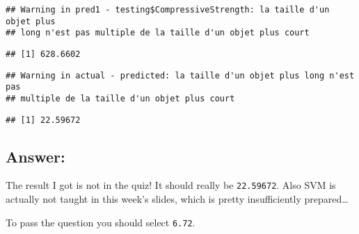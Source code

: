 \documentclass[]{article}
\newenvironment{Shaded}{\begin{snugshade}}{\end{snugshade}}
\newcommand{\KeywordTok}[1]{\textcolor[rgb]{0.13,0.29,0.53}{\textbf{#1}}}
\newcommand{\OperatorTok}[1]{\textcolor[rgb]{0.81,0.36,0.00}{\textbf{#1}}}
\newcommand{\NormalTok}[1]{#1}
\begin{document}
\begin{verbatim}
## Warning in pred1 - testing$CompressiveStrength: la taille d'un objet plus
## long n'est pas multiple de la taille d'un objet plus court
\end{verbatim}

\begin{verbatim}
## [1] 628.6602
\end{verbatim}

\begin{Shaded}
\end{Shaded}

\begin{verbatim}
## Warning in actual - predicted: la taille d'un objet plus long n'est pas
## multiple de la taille d'un objet plus court
\end{verbatim}

\begin{verbatim}
## [1] 22.59672
\end{verbatim}

\subsection{Answer:}\label{answer}

The result I got is not in the quiz! It should really be
\texttt{22.59672}. Also SVM is actually not taught in this week's
slides, which is pretty insufficiently prepared\ldots{}

To pass the question you should select \texttt{6.72}.
\end{document}
